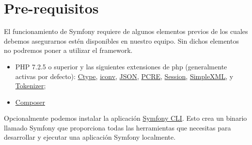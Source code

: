 \section{Pre-requisitos}
El funcionamiento de Symfony requiere de algunos elementos previos de los cuales debemos asegurarnos estén disponibles en nuestro equipo. Sin dichos elementos no podremos poner a utilizar el framework.

\begin{itemize}
    \item PHP 7.2.5 o superior y las siguientes extensiones de php (generalmente activas por defecto): \href{https://www.php.net/book.ctype}{Ctype}, \href{https://www.php.net/book.iconv}{iconv}, \href{https://www.php.net/book.json}{JSON}, \href{https://www.php.net/book.pcre}{PCRE}, \href{https://www.php.net/book.session}{Session}, \href{https://www.php.net/book.simplexml}{SimpleXML}, y \href{https://www.php.net/book.tokenizer}{Tokenizer};
    \item \href{https://getcomposer.org/download/}{Composer}
\end{itemize}

Opcionalmente podemos instalar la aplicación \href{https://symfony.com/download}{Symfony CLI}.
Esto crea un binario llamado Symfony que proporciona todas las herramientas que necesitas para desarrollar y ejecutar una aplicación Symfony localmente.
